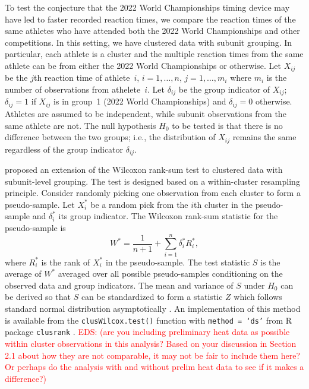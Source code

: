 \documentclass[12pt, letterpaper, titlepage]{article}
\newcommand{\eds}[1]{\textcolor{red}{EDS: (#1)}}
\begin{document}
To test the conjecture that the 2022 World Championships timing device may have 
led to faster recorded reaction times, we compare the reaction times of the same
athletes who have attended both the 2022 World Championships and other 
competitions. 
In this setting, we have clustered data with subunit grouping. In particular,
each athlete is a cluster and the multiple reaction times from the same athlete
can be from either the 2022 World Championships or otherwise.
Let $X_{ij}$ be the $j$th reaction time of athlete~$i$, $i = 1, \ldots, n$,
$j = 1, \ldots, m_i$ where $m_i$ is the number of observations from
athelete~$i$. Let $\delta_{ij}$ be the group indicator of $X_{ij}$; $\delta_{ij}
= 1$ if $X_{ij}$ is in group~1 (2022 World Championships) and $\delta_{ij} = 0$ 
otherwise. Athletes are
assumed to be independent, while subunit observations from the same athlete are
not. The null hypothesis $H_0$ to be tested is that there is no difference
between the two groups; i.e., the distribution of $X_{ij}$ remains the same
regardless of the group indicator $\delta_{ij}$.


\citet{datta2005rank} proposed an extension of the Wilcoxon rank-sum test to
clustered data with subunit-level grouping. The test is designed based on a
within-cluster resampling principle. Consider randomly picking one observation
from each cluster to form a pseudo-sample. Let $X_i^*$ be a random pick from the
$i$th cluster in the pseudo-sample and $\delta_i^*$ its group indicator. The
Wilcoxon rank-sum statistic for the pseudo-sample is
\[
W^* = \frac{1}{n + 1} + \sum_{i=1}^{n} \delta_{i}^{*} R_{i}^{*},
\]
where $R_{i}^{*}$ is the rank of $X_{i}^{*}$ in the pseudo-sample.
The test statistic $S$ is the average of $W^*$ averaged over all possible
pseudo-samples conditioning on the observed data and group indicators.
The mean and variance of $S$ under $H_0$ can be derived so that $S$ can be
standardized to form a statistic $Z$ which follows standard normal distribution
asymptotically \citep[p.910]{datta2005rank}. An implementation of this method is
available from the \texttt{clusWilcox.test()} function with
\texttt{method = `ds'} from R package \texttt{clusrank}
\citep{jiang2017wilcoxon}.
\eds{are you including preliminary heat data as possible within cluster 
observations in this analysis?  Based on your 
discussion in Section 2.1 about how they are not comparable, it may not be fair 
to include them here?  Or perhaps do the analysis with and without prelim heat
data to see if it makes a difference?}

\end{document}
